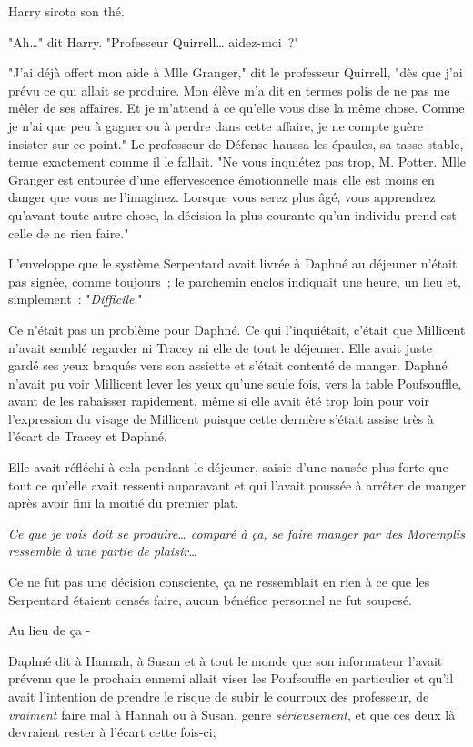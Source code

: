 Harry sirota son thé.

"Ah…" dit Harry. "Professeur Quirrell… aidez-moi~?"

"J'ai déjà offert mon aide à Mlle Granger," dit le professeur Quirrell, "dès que j'ai prévu ce qui allait se produire. Mon élève m'a dit en termes polis de ne pas me mêler de ses affaires. Et je m'attend à ce qu'elle vous dise la même chose. Comme je n'ai que peu à gagner ou à perdre dans cette affaire, je ne compte guère insister sur ce point." Le professeur de Défense haussa les épaules, sa tasse stable, tenue exactement comme il le fallait. "Ne vous inquiétez pas trop, M. Potter. Mlle Granger est entourée d'une effervescence émotionnelle mais elle est moins en danger que vous ne l'imaginez. Lorsque vous serez plus âgé, vous apprendrez qu'avant toute autre chose, la décision la plus courante qu'un individu prend est celle de ne rien faire."

\later

L'enveloppe que le système Serpentard avait livrée à Daphné au déjeuner n'était pas signée, comme toujours~; le parchemin enclos indiquait une heure, un lieu et, simplement~: "\emph{Difficile}."

Ce n'était pas un problème pour Daphné. Ce qui l'inquiétait, c'était que Millicent n'avait semblé regarder ni Tracey ni elle de tout le déjeuner. Elle avait juste gardé ses yeux braqués vers son assiette et s'était contenté de manger. Daphné n'avait pu voir Millicent lever les yeux qu'une seule fois, vers la table Poufsouffle, avant de les rabaisser rapidement, même si elle avait été trop loin pour voir l'expression du visage de Millicent puisque cette dernière s'était assise très à l'écart de Tracey et Daphné.

Elle avait réfléchi à cela pendant le déjeuner, saisie d'une nausée plus forte que tout ce qu'elle avait ressenti auparavant et qui l'avait poussée à arrêter de manger après avoir fini la moitié du premier plat.

\emph{Ce que je vois doit se produire… comparé à ça, se faire manger par des Moremplis ressemble à une partie de plaisir…}

Ce ne fut pas une décision consciente, ça ne ressemblait en rien à ce que les Serpentard étaient censés faire, aucun bénéfice personnel ne fut soupesé.

Au lieu de ça -

Daphné dit à Hannah, à Susan et à tout le monde que son informateur l'avait prévenu que le prochain ennemi allait viser les Poufsouffle en particulier et qu'il avait l'intention de prendre le risque de subir le courroux des professeur, de \emph{vraiment} faire mal à Hannah ou à Susan, genre \emph{sérieusement}, et que ces deux là devraient rester à l'écart cette fois-ci;


